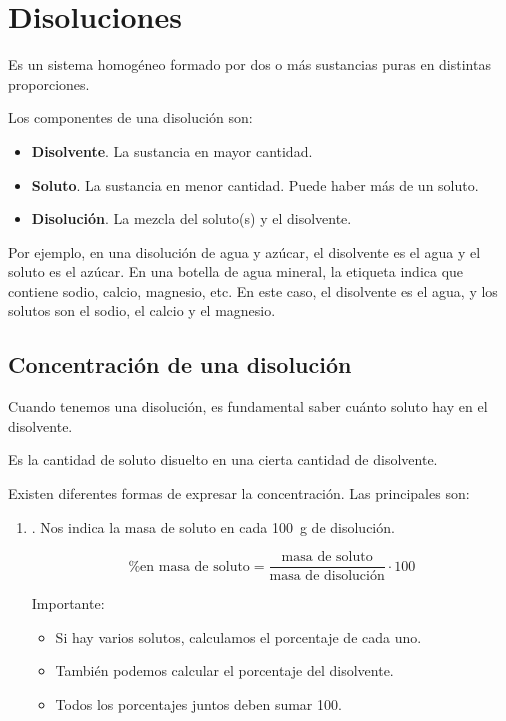 \section{Disoluciones}

\begin{definition}[Disolución]
    Es un sistema homogéneo formado por dos o más sustancias puras en distintas proporciones.
\end{definition}

Los componentes de una disolución son:
\begin{itemize}
    \item \textbf{Disolvente}. La sustancia en mayor cantidad.
    \item \textbf{Soluto}. La sustancia en menor cantidad. Puede haber más de un soluto.
    \item \textbf{Disolución}. La mezcla del soluto(s) y el disolvente.
\end{itemize}

Por ejemplo, en una disolución de agua y azúcar, el disolvente es el agua y el soluto es el azúcar.
En una botella de agua mineral, la etiqueta indica que contiene sodio, calcio, magnesio, etc.
En este caso, el disolvente es el agua, y los solutos son el sodio, el calcio y el magnesio.

\subsection{Concentración de una disolución}

Cuando tenemos una disolución, es fundamental saber cuánto soluto hay en el disolvente.

\begin{definition}[Concentración]
    Es la cantidad de soluto disuelto en una cierta cantidad de disolvente.
\end{definition}

Existen diferentes formas de expresar la concentración. Las principales son:

\begin{enumerate}[label=\numberballmDarkTeal]
\item {}.
Nos indica la masa de soluto en cada \qty{100}{\g} de disolución.

\begin{equation}
    \text{\% en masa de soluto} = \dfrac{\text{masa de soluto}}{\text{masa de disolución}}\cdot 100
    \label{eq:porcentaje_masa}
\end{equation}

Importante:
\begin{itemize}
    \item Si hay varios solutos, calculamos el porcentaje de cada uno.
    \item También podemos calcular el porcentaje del disolvente.
    \item Todos los porcentajes juntos deben sumar \num{100}.
\end{itemize}
\end{enumerate}

